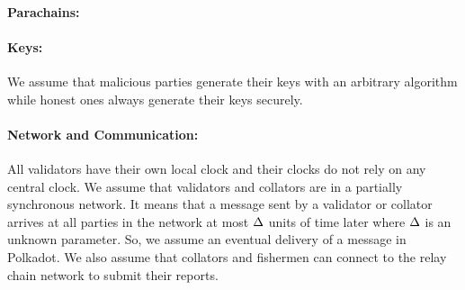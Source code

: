 \paragraph{Parachains:} %

\paragraph{Keys:} We assume that malicious parties generate their keys with an arbitrary algorithm
while honest ones always generate their keys securely. 

\paragraph{Network and Communication:} All validators have their own local clock and their clocks do not rely on any central clock.
We assume that  validators and collators are in a partially synchronous network.
It means that a message sent by a validator or collator arrives at all parties in the network
at most $\Delta$ units of time later where $\Delta$ is an unknown parameter. So, we assume an eventual delivery of a message in Polkadot.
We also assume that collators and fishermen can connect to the relay chain network to submit their reports.
